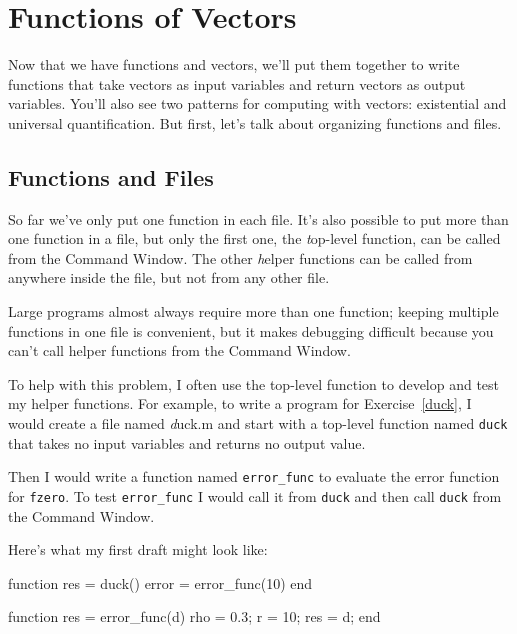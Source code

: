 \chapter{Functions of Vectors}
\minitoc

Now that we have functions and vectors, we'll put them together to write functions that take vectors as input variables and return vectors as output variables.  You'll also see two patterns for computing with vectors: existential and universal quantification.  But first, let's talk about organizing functions and files.

\section{Functions and Files}
\label{funfiles}

So far we've only put one function in each file.  It's also possible
to put more than one function in a file, but only the first one, the
{\emph top-level function}, can be called from the Command
Window. 
The other {\emph helper functions} can be called from anywhere inside the file, but not from any other file.


Large programs almost always require more than one function; keeping
multiple functions in one file is convenient, but it makes debugging
difficult because you can't call helper functions from the Command
Window.


To help with this problem, I often use the top-level function
to develop and test my helper functions.  For example, to write
a program for Exercise~\ref{duck}, I would create a file named
{\emph duck.m} and start with a top-level function named {\tt duck}
that takes no input variables and returns no output value.

Then I would write a function named {\tt error\_func} to
evaluate the error function for {\tt fzero}.  To test
{\tt error\_func} I would call it from {\tt duck} and then
call {\tt duck} from the \sf Command Window.


Here's what my first draft might look like:

\begin{code}
function res = duck()
    error = error_func(10)
end

function res = error_func(d)
    rho = 0.3;      %
    r = 10;         %
    res = d;
end
\end{code}

